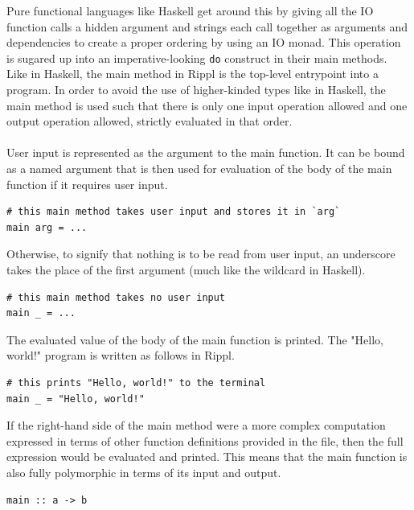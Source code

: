 \documentclass[5pt]{article}
\begin{document}
\noindent Pure functional languages like Haskell get around this by giving all the IO function calls a hidden argument and strings each call together as arguments and dependencies to create a proper ordering by using an IO monad. This operation is sugared up into an imperative-looking \texttt{do} construct in their main methods. \\

\noindent Like in Haskell, the main method in Rippl is the top-level entrypoint into a program. In order to avoid the use of higher-kinded types like in Haskell, the main method is used such that there is only one input operation allowed and one output operation allowed, strictly evaluated in that order.  \\\\
User input is represented as the argument to the main function. It can be bound as a named argument that is then used for evaluation of the body of the main function if it requires user input. \\
\begin{lstlisting}[language=rippl]
# this main method takes user input and stores it in `arg`
main arg = ... 
\end{lstlisting}
Otherwise, to signify that nothing is to be read from user input, an underscore takes the place of the first argument (much like the wildcard in Haskell). \\

\begin{lstlisting}[language=rippl]
# this main method takes no user input
main _ = ...    
\end{lstlisting}

The evaluated value of the body of the main function is printed. The "Hello, world!" program is written as follows in Rippl.

\begin{lstlisting}[language=rippl]
# this prints "Hello, world!" to the terminal
main _ = "Hello, world!"
\end{lstlisting}

If the right-hand side of the main method were a more complex computation expressed in terms of other function definitions provided in the file, then the full expression would be evaluated and printed. This means that the main function is also fully polymorphic in terms of its input and output. \\

\begin{lstlisting}[language=rippl]
main :: a -> b
\end{lstlisting}
\end{document}
